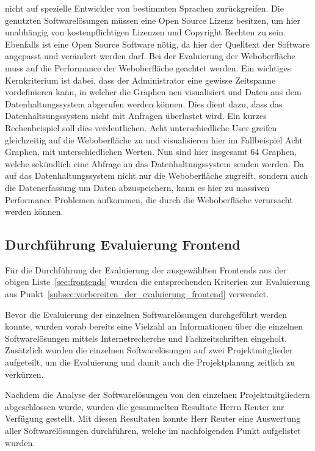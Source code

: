 \begin{outline}
  nicht auf spezielle Entwickler von bestimmten Sprachen zurückgreifen.
  \1 Die genutzten Softwarelösungen müssen eine Open Source Lizenz besitzen, um
  hier unabhängig von kostenpflichtigen Lizenzen und Copyright Rechten zu sein.
  Ebenfalls ist eine Open Source Software nötig, da hier der Quelltext der
  Software angepasst und verändert werden darf.
  \1 Bei der Evaluierung der Weboberfläche muss auf die Performance der
  Weboberfläche geachtet werden. Ein wichtiges Kernkriterium ist dabei, dass
  der Administrator eine gewisse Zeitspanne vordefinieren kann, in welcher die
  Graphen neu visualisiert und Daten aus dem Datenhaltungssystem abgerufen
  werden können. Dies dient dazu, dass das Datenhaltsungssystem nicht mit
  Anfragen überlastet wird. Ein kurzes Rechenbeispiel soll dies verdeutlichen.
  Acht unterschiedliche User greifen gleichzeitig auf die Weboberfläche zu und
  visualisieren hier im Fallbeispiel Acht Graphen, mit unterschiedlichen
  Werten. Nun sind hier insgesamt 64 Graphen, welche sekündlich eine Abfrage an
  das Datenhaltungssystem senden werden. Da auf das Datenhaltungssystem nicht
  nur die Weboberfläche zugreift, sondern auch die Datenerfassung um Daten
  abzuspeichern, kann es hier zu massiven Performance Problemen aufkommen, die
  durch die Weboberfläche verursacht werden können.
\end{outline}
\mr%

\subsection{Durchführung Evaluierung Frontend}
\label{subsec:durchfuehrung_evaluierung_frontend}
Für die Durchführung der Evaluierung der ausgewählten Frontends aus der obigen
Liste~\ref{sec:frontends} wurden die entsprechenden Kriterien zur
Evaluierung aus Punkt~\ref{subsec:vorbereiten_der_evaluierung_frontend}
verwendet.


Bevor die Evaluierung der einzelnen Softwarelösungen durchgeführt werden
konnte, wurden vorab bereits eine Vielzahl an Informationen über die einzelnen
Softwarelösungen mittels Internetrecherche und Fachzeitschriften eingeholt.
Zusätzlich wurden die einzelnen Softwarelösungen auf zwei Projektmitglieder
aufgeteilt, um die Evaluierung und damit auch die Projektplanung zeitlich zu
verkürzen.

Nachdem die Analyse der Softwarelösungen von den einzelnen Projektmitgliedern
abgeschlossen wurde, wurden die gesammelten Resultate Herrn Reuter zur
Verfügung gestellt. Mit diesen Resultaten konnte Herr Reuter eine Auswertung
aller Softwarelösungen durchführen, welche im nachfolgenden Punkt aufgelistet
wurden.

